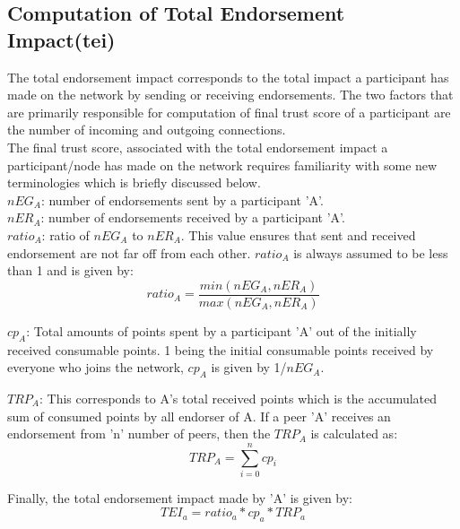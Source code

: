 \subsection{Computation of Total Endorsement Impact(tei)} 
The total endorsement impact corresponds to the total impact a participant has
made on the network by sending or receiving endorsements. The two factors that
are primarily responsible for computation of final trust score of a participant
are the number of incoming and outgoing connections. \\

The final trust score, associated with the total endorsement impact a
participant/node has made on the network requires familiarity with some new
terminologies which is briefly discussed below. \\

\textit{$nEG_A$}: number of endorsements sent by a participant 'A'. \\

\textit{$nER_A$}: number of endorsements received by a participant 'A'. \\

\textit{$ratio_A$}: ratio of \textit{$nEG_A$} to \textit{$nER_A$}. This value
ensures that sent and received endorsement are not far off from  each other.
\textit{$ratio_A$} is always assumed to be less than 1 and is given by: 
\begin{equation}
	ratio_A = \frac{min(nEG_A,nER_A)}{max(nEG_A,nER_A)} 
\end{equation}

\textit{$cp_A$}: Total amounts of points spent by a participant 'A' out of the
initially received consumable points. 1 being the initial consumable points
received by everyone who joins the network, \textit{$cp_A$} is given by
1/\textit{$nEG_A$}.

\textit{$TRP_A$}: This corresponds to A's total received points which is the
accumulated sum of consumed points by all endorser of A.  If a peer 'A'
receives an endorsement from 'n' number of peers, then the \textit{$TRP_A$} is
calculated as:
\begin{equation}
	TRP_A  = \sum_{i=0}^{n}cp_{i}
\end{equation}

Finally, the total endorsement impact made by 'A' is given by: \\
\begin{equation}
	TEI_a = ratio_a * cp_a * TRP_a
\end{equation}

